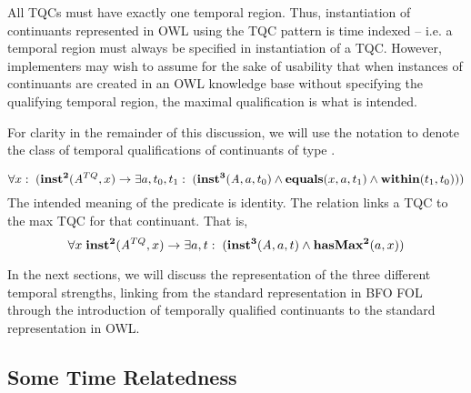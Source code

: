 All TQCs must have exactly one temporal region. Thus, instantiation of continuants represented in OWL using the TQC pattern is time indexed -- i.e. a temporal region must always be specified in instantiation of a TQC. However, implementers may wish to assume for the sake of usability that when instances of continuants are created in an OWL knowledge base without specifying the qualifying temporal region, the maximal qualification is what is intended. 

For clarity in the remainder of this discussion, we will use the notation  to denote the class of temporal qualifications of
continuants of type .

\begin{equation}
\forall x:\; (\mathrm{\mathbf{inst^2}}(\mathit{A}^{TQ},x) \rightarrow \exists a,t_0,t_1:\;(
\mathrm{\mathbf{inst^3}}(\mathit{A},a,t_0) \wedge \mathrm{\mathbf{equals}}(x,a,t_1) \wedge
\mathrm{\mathbf{within}}(t_1,t_0)))
\end{equation}
The intended meaning of the predicate  is identity.  
The relation  links a TQC to the max TQC for that continuant. That is,
\begin{equation}
\forall x\; \mathrm{\mathbf{inst^2}}(\mathit{A}^{TQ},x) \rightarrow \exists a,t:\;(
\mathrm{\mathbf{inst^3}}(\mathit{A}, a,t) \wedge \mathrm{\mathbf{hasMax^2}}(a,x))
\end{equation}

In the next sections, we will discuss the representation of the three different
temporal strengths, linking from the standard representation in BFO FOL through
the introduction of temporally qualified continuants to the standard
representation in OWL.

\subsection*{Some Time Relatedness}

